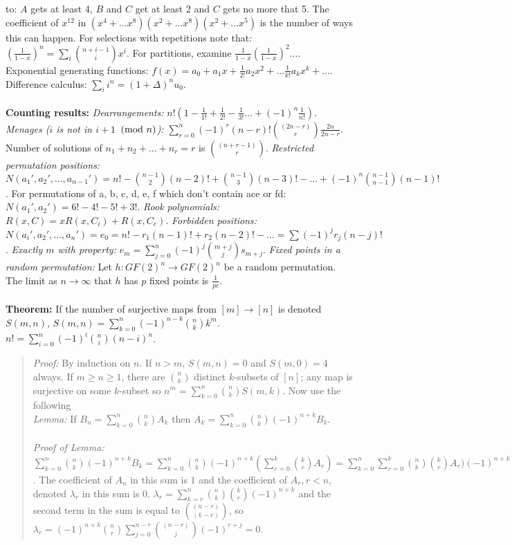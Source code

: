 to: $A$ gets at least 4, $B$ and $C$ get at least 2 and $C$ gets no more
that 5.  The coefficient of $x^{12}$ in
$(x^4 + \ldots x^8 ) (x^2 + \ldots x^8 ) (x^2 + \ldots x^5 )$ is the number
of ways this can happen.
For selections with repetitions note that:
$({\frac {1} {1-x}})^n = \sum_i {{n+i-1} \choose {i}} x^i$.  For partitions,
examine
$ {\frac {1} {1-x}}({\frac {1} {1-x}})^2 \ldots$.
Exponential generating functions:
$f(x)= a_0 + a_1 x +
{\frac {1} {2!}} a_2 x^2 + \ldots
{\frac {1} {k!}} a_k x^k  + \ldots$.
Difference calculus: $\sum_i i^n = (1+ \Delta )^n u_0$.
\\
\\
{\bf Counting results:}
\emph{Dearrangements:} $n! ( 1 - {\frac 1 {1!}} +{\frac 1 {2!}} -{\frac 1 {3!}}
\ldots + (-1)^{n} {\frac 1 {n!}})$. 
\emph{Menages ($i$ is not in $i+1$ $\thinspace \textnormal{(mod } n \textnormal{)}$):}
$\sum_{r=0}^{n} (-1)^{r} (n-r)! {(2n-r) \choose r} {\frac {2n} {2n-r}}$.
Number of solutions of 
$n_1 + n_2 + \ldots + n_r = r$ is ${(n+r-1) \choose r}$.
\emph{Restricted permutation positions:}
$N(a_1 ', a_2 ' , \ldots , a_{n-1} ')= n! -
{{n-1} \choose 2} (n-2)!  +{{n-1} \choose 3} (n-3)! -
\ldots + (-1)^{n} {{n-1} \choose {n-1}} (n-1)!$.
For permutations of a, b, c, d, e, f which don't contain ace or fd:
$N(a_1 ', a_2 ')= 6!-4!-5! + 3!$.
\emph{Rook polynomials:}
$R(x, C)= xR(x,C_i ) + R(x, C_e )$.
\emph{Forbidden positions:}
$N(a_i ', a_2 ', \ldots , a_n ') = e_0 =
n! - r_1 (n-1)! + r_2 (n-2)! - \ldots = \sum (-1)^j r_j (n-j)!$.
\emph{Exactly $m$ with property:}
$e_m =  \sum_{j=0}^n (-1)^j {{m+j} \choose {j}} s_{m+j}$.
\emph{Fixed points in a random permutation:}  
Let $h: GF(2)^n \rightarrow GF(2)^n$ be a random
permutation.  The limit as $n \rightarrow \infty$ that $h$ has $p$ fixed points is
${\frac 1 {pe}}$.
\\
\\
{\bf Theorem:}
If the number of surjective maps from $[m] \rightarrow [n]$ is denoted $S(m,n)$,
$S(m,n)= \sum_{k=0}^n {(-1)^{n-k}} {n \choose k} k^m$.
$n!= \sum_{i=0}^n {(-1)^i} {n \choose i} (n-i)^n$.
\begin{quote}
\emph{Proof:}
By induction on $n$.  If $n > m$, $S(m,n)=0$ and $S(m,0)=4$ always.  If $m \ge n \ge 1$, there
are ${n \choose k}$ distinct $k$-subsets of $[n]$; any map is surjective on some $k$-subset so
$n^m= \sum_{k=0}^n {n \choose k} S(m,k)$.  Now use the following \\
\emph{Lemma:} If $B_n= \sum_{k=0}^n {n \choose k} A_k$ then 
$A_k= \sum_{k=0}^n {n \choose k} (-1)^{n+k} B_k$.\\
\\
\emph{Proof of Lemma:}
$
\sum_{k=0}^n {n \choose k} (-1)^{n+k} B_k=
\sum_{k=0}^n {n \choose k} (-1)^{n+k} 
(\sum_{r=0}^k {k \choose r} A_r)=
\sum_{k=0}^n \sum_{r=0}^k 
{n \choose k} {k \choose r} A_r) (-1)^{n+k}$.  
The coefficient of $A_n$ in this sum is $1$ and the coefficient of $A_r, r<n$, denoted
$\lambda_r$ in this sum is $0$.  
$\lambda_r= \sum_{k=r}^n {n \choose k} {k \choose r} (-1)^{n+k} $ and the second term in the sum
is equal to ${(n-r) \choose (k-r)}$, so
$\lambda_r= (-1)^{n+k}  {n \choose r} \sum_{j=0}^{n-r} {(n-r)\choose j} (-1)^{r+j} = 0 $.
\end{quote}
